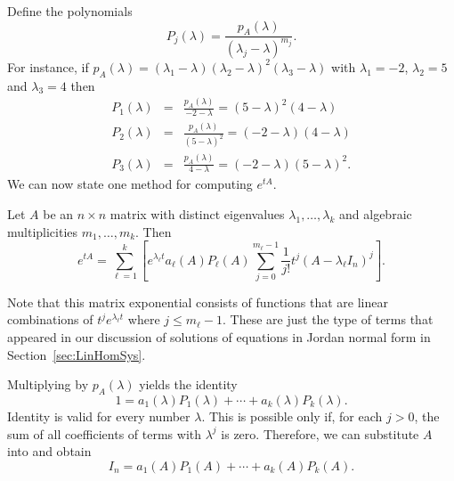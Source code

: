 Define the polynomials 
\begin{equation}  \label{e:Pj}
P_j(\lambda) = \frac{p_A(\lambda)}{(\lambda_j-\lambda)^{m_j}}.
\end{equation}
For instance, if 
$p_A(\lambda)=(\lambda_1-\lambda)(\lambda_2-\lambda)^2(\lambda_3-\lambda)$ 
with $\lambda_1 = -2$, $\lambda_2 = 5$ and $\lambda_3 = 4$ then
\begin{eqnarray*}
P_1(\lambda) &=& \frac{p_A(\lambda)}{-2-\lambda}=(5-\lambda)^2(4-\lambda)\\
P_2(\lambda) &=& \frac{p_A(\lambda)}{(5-\lambda)^2}=(-2-\lambda)(4-\lambda)\\
P_3(\lambda) &=& \frac{p_A(\lambda)}{4-\lambda}=(-2-\lambda)(5-\lambda)^2.
\end{eqnarray*}
We can now state one method for computing $e^{tA}$.
\begin{thm} \label{T:etA}
Let $A$ be an $n\times n$ matrix with distinct eigenvalues 
$\lambda_1,\ldots,\lambda_k$ and algebraic multiplicities $m_1,\ldots,m_k$.  
Then
\[
e^{tA} = \sum_{\ell=1}^k \left[e^{\lambda_\ell t}a_\ell(A)P_\ell(A)
\sum_{j=0}^{m_\ell-1}\frac{1}{j!}t^j(A-\lambda_\ell I_n)^j\right].
\]
\end{thm}

Note that this matrix exponential consists of functions that are linear 
combinations of $t^je^{\lambda_\ell t}$ where $j\leq m_\ell-1$.  These
are just the type of terms that appeared in our discussion of solutions 
of equations in Jordan normal form in Section~\ref{sec:LinHomSys}.

\proof Multiplying  by $p_A(\lambda)$ yields the identity
\begin{equation}  \label{e:p=aP}
1 = a_1(\lambda)P_1(\lambda) + \cdots + a_k(\lambda)P_k(\lambda).
\end{equation}
Identity  is valid for every number $\lambda$.  This is 
possible only if, for each $j>0$, the sum of all coefficients of terms 
with $\lambda^j$ is zero.  Therefore, we can substitute $A$ into 
 and obtain
\begin{equation}  \label{e:p=AP}
I_n = a_1(A)P_1(A) + \cdots + a_k(A)P_k(A).
\end{equation}

